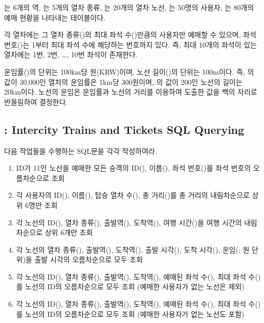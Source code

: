 는 6개의 역, 는 5개의 열차 종류, 는 20개의 열차 노선, 는 50명의 사용자, 는 80개의 예매 현황을 나타내는 테이블이다.

각 열차에는 그 열차 종류()의 최대 좌석 수()만큼의 사용자만 예매할 수 있으며, 좌석 번호()는 1부터 최대 좌석 수에 해당하는 번호까지 있다. 즉, 최대 10개의 좌석이 있는 열차에는 1번, 2번, \ldots, 10번 좌석이 존재한다.

운임률()의 단위는 100km당 원(KRW)이며, 노선 길이()의 단위는 100m이다. 즉, 의 값이 30,000인 열차의 운임률은 1km당 300원이며, 의 값이 200인 노선의 길이는 20km이다. 노선의 운임은 운임률과 노선의 거리를 이용하여 도출한 값을 백의 자리로 반올림하여 결정한다.

\subsection*{: Intercity Trains and Tickets SQL Querying}

다음 작업들을 수행하는 SQL문을 각각 작성하여라.

\begin{enumerate}
    \item ID가 11인 노선을 예매한 모든 승객의 ID(), 이름(), 좌석 번호()를 좌석 번호의 오름차순으로 조회
    \item 각 사용자의 ID(), 이름(), 탑승 열차 수(), 총 거리()를 총 거리의 내림차순으로 상위 6명만 조회
    \item 각 노선의 ID(), 열차 종류(), 출발역(), 도착역(), 여행 시간()을 여행 시간의 내림차순으로 상위 6개만 조회
    \item 각 노선의 열차 종류(), 출발역(), 도착역(), 출발 시각(), 도착 시각(), 운임(; 원 단위)을 출발 시각의 오름차순으로 모두 조회
    \item 각 노선의 ID(), 열차 종류(), 출발역(), 도착역(), 예매된 좌석 수(), 최대 좌석 수()를 노선의 ID의 오름차순으로 모두 조회 (예매한 사용자가 없는 노선은 제외)
    \item 각 노선의 ID(), 열차 종류(), 출발역(), 도착역(), 예매된 좌석 수(), 최대 좌석 수()를 노선의 ID의 오름차순으로 모두 조회 (예매한 사용자가 없는 노선도 포함)
\end{enumerate}

